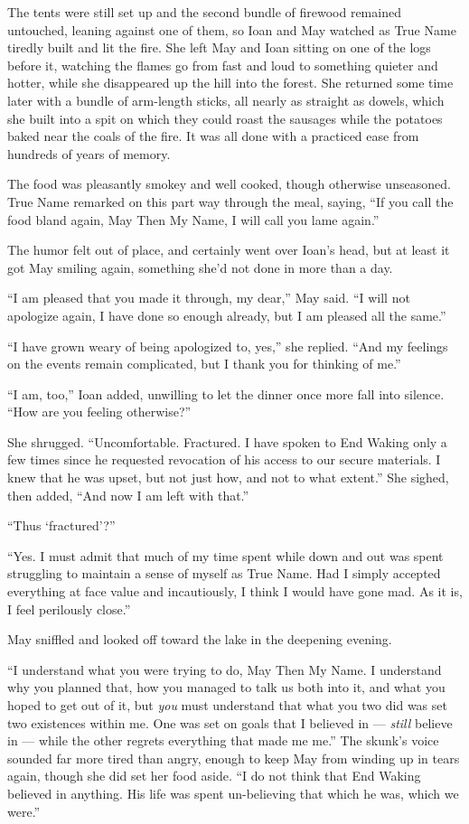 The tents were still set up and the second bundle of firewood remained untouched, leaning against one of them, so Ioan and May watched as True Name tiredly built and lit the fire. She left May and Ioan sitting on one of the logs before it, watching the flames go from fast and loud to something quieter and hotter, while she disappeared up the hill into the forest. She returned some time later with a bundle of arm-length sticks, all nearly as straight as dowels, which she built into a spit on which they could roast the sausages while the potatoes baked near the coals of the fire. It was all done with a practiced ease from hundreds of years of memory.

The food was pleasantly smokey and well cooked, though otherwise unseasoned. True Name remarked on this part way through the meal, saying, ``If you call the food bland again, May Then My Name, I will call you lame again.''

The humor felt out of place, and certainly went over Ioan's head, but at least it got May smiling again, something she'd not done in more than a day.

``I am pleased that you made it through, my dear,'' May said. ``I will not apologize again, I have done so enough already, but I am pleased all the same.''

``I have grown weary of being apologized to, yes,'' she replied. ``And my feelings on the events remain complicated, but I thank you for thinking of me.''

``I am, too,'' Ioan added, unwilling to let the dinner once more fall into silence. ``How are you feeling otherwise?''

She shrugged. ``Uncomfortable. Fractured. I have spoken to End Waking only a few times since he requested revocation of his access to our secure materials. I knew that he was upset, but not just how, and not to what extent.'' She sighed, then added, ``And now I am left with that.''

``Thus `fractured'?''

``Yes. I must admit that much of my time spent while down and out was spent struggling to maintain a sense of myself as True Name. Had I simply accepted everything at face value and incautiously, I think I would have gone mad. As it is, I feel perilously close.''

May sniffled and looked off toward the lake in the deepening evening.

``I understand what you were trying to do, May Then My Name. I understand why you planned that, how you managed to talk us both into it, and what you hoped to get out of it, but \emph{you} must understand that what you two did was set two existences within me. One was set on goals that I believed in — \emph{still} believe in — while the other regrets everything that made me me.'' The skunk's voice sounded far more tired than angry, enough to keep May from winding up in tears again, though she did set her food aside. ``I do not think that End Waking believed in anything. His life was spent un-believing that which he was, which we were.''

